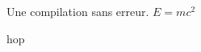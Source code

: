 \documentclass{article}
\begin{document}
Une compilation sans erreur.
$E = mc^2$



hop
\end{document}

